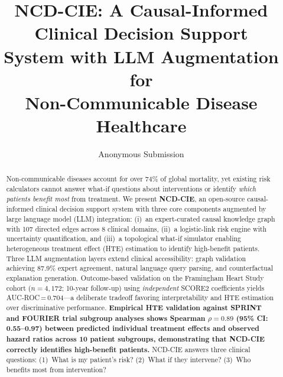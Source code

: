 \documentclass[runningheads]{llncs}
\begin{document}
\title{NCD-CIE: A Causal-Informed Clinical Decision Support\\System with LLM Augmentation for\\Non-Communicable Disease Healthcare}

\author{Anonymous Submission}

\maketitle

\begin{abstract}
Non-communicable diseases account for over 74\% of global mortality,
yet existing risk calculators cannot answer what-if questions about
interventions or identify \emph{which patients benefit most} from
treatment.
We present \textbf{NCD-CIE}, an open-source causal-informed clinical
decision support system with three core components augmented by large
language model (LLM) integration:
(i)~an expert-curated causal knowledge graph with 107 directed edges
across 8 clinical domains,
(ii)~a logistic-link risk engine with uncertainty quantification, and
(iii)~a topological what-if simulator enabling heterogeneous treatment
effect (HTE) estimation to identify high-benefit patients.
Three LLM augmentation layers extend clinical accessibility:
graph validation achieving 87.9\% expert agreement,
natural language query parsing, and
counterfactual explanation generation.
Outcome-based validation on the Framingham Heart Study cohort
($n\!=\!4{,}172$; 10-year follow-up) using \emph{independent} SCORE2
coefficients yields AUC-ROC\,=\,0.704---a deliberate tradeoff
favoring interpretability and HTE estimation over discriminative
performance.
\textbf{Empirical HTE validation against SPRINT and FOURIER trial
subgroup analyses shows Spearman $\rho = 0.89$ (95\% CI: 0.55--0.97)
between predicted individual treatment effects and observed hazard
ratios across 10 patient subgroups, demonstrating that NCD-CIE
correctly identifies high-benefit patients.}
NCD-CIE answers three clinical questions: (1)~What is my patient's
risk? (2)~What if they intervene? (3)~Who benefits most from
intervention?

\end{abstract}
\end{document}
